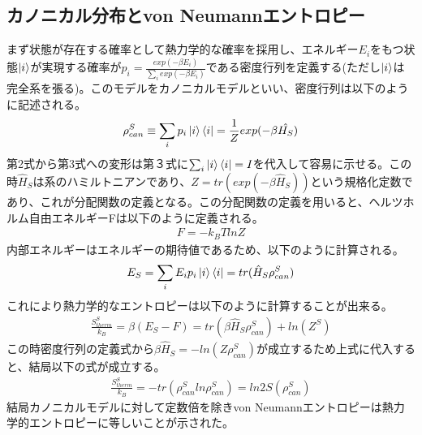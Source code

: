 \documentclass[a4paper,10.5pt]{article}
\numberwithin{equation}{section}
\begin{document}
\subsection{カノニカル分布とvon Neumannエントロピー}
まず状態が存在する確率として熱力学的な確率を採用し、エネルギー$E_{i}$をもつ状態$\ket{i}$が実現する確率が$p_{i}=\frac{exp(-\beta E_{i})}{\sum_{i}exp(-\beta E_{i})}$である密度行列を定義する(ただし$\ket{i}$は完全系を張る)。このモデルをカノニカルモデルといい、密度行列は以下のように記述される。
\begin{equation}\begin{split}
    \rho_{can}^{S} \equiv \sum_{i}p_{i}\ket{i}\bra{i} =\frac{1}{Z}exp(-\beta \hat{H_{S}}) \label{canonical}
\end{split} \end{equation}
第2式から第3式への変形は第３式に$\sum_{i}\ket{i}\bra{i}=I$を代入して容易に示せる。この時$\hat{H}_{S}$は系のハミルトニアンであり、$Z=tr(exp(-\beta \hat{H}_{S}))$という規格化定数であり、これが分配関数の定義となる。この分配関数の定義を用いると、ヘルツホルム自由エネルギーFは以下のように定義される。
\begin{equation}\begin{split}
    F=-k_{B}TlnZ
\end{split} \end{equation}
内部エネルギーはエネルギーの期待値であるため、以下のように計算される。
\begin{equation}\begin{split}
    E_{S}=\sum_{i} E_{i}p_{i}\ket{i}\bra{i}=tr(\hat{H}_{S}\rho_{can}^{S})    
\end{split} \end{equation}
これにより熱力学的なエントロピーは以下のように計算することが出来る。
\begin{equation}\begin{split}
    \frac{S^{S}_{therm}}{k_{B}}=\beta (E_{S}-F)=tr(\beta \hat{H}_{S}\rho_{can}^{S})+ln(Z^{S})
\end{split} \end{equation}
この時密度行列の定義式から$\beta{}\hat{H}_{S}=-ln(Z\rho_{can}^{S})$が成立するため上式に代入すると、結局以下の式が成立する。
\begin{equation}\begin{split}
    \frac{S^{S}_{therm}}{k_{B}}=-tr(\rho_{can}^{S}ln\rho_{can}^{S})=ln2S(\rho_{can}^{S})
\end{split} \end{equation}
結局カノニカルモデルに対して定数倍を除きvon Neumannエントロピーは熱力学的エントロピーに等しいことが示された。
\end{document}
